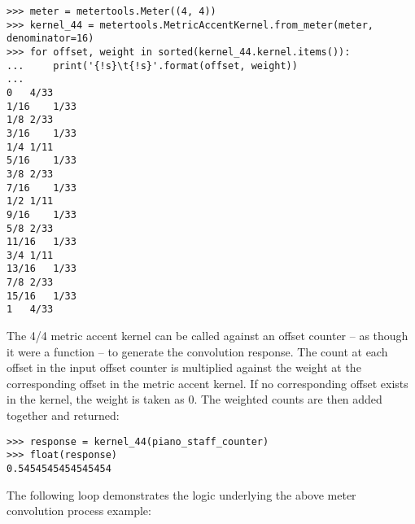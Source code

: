 \begin{comment}
<abjad>
meter = metertools.Meter((4, 4))
kernel_44 = metertools.MetricAccentKernel.from_meter(meter, denominator=16)
for offset, weight in sorted(kernel_44.kernel.items()):
    print('{!s}\t{!s}'.format(offset, weight))

</abjad>
\end{comment}

\begin{abjadbookoutput}
\begin{singlespacing}
\vspace{-0.5\baselineskip}
\begin{verbatim}
>>> meter = metertools.Meter((4, 4))
>>> kernel_44 = metertools.MetricAccentKernel.from_meter(meter, denominator=16)
>>> for offset, weight in sorted(kernel_44.kernel.items()):
...     print('{!s}\t{!s}'.format(offset, weight))
...
0	4/33
1/16	1/33
1/8	2/33
3/16	1/33
1/4	1/11
5/16	1/33
3/8	2/33
7/16	1/33
1/2	1/11
9/16	1/33
5/8	2/33
11/16	1/33
3/4	1/11
13/16	1/33
7/8	2/33
15/16	1/33
1	4/33
\end{verbatim}
\end{singlespacing}
\end{abjadbookoutput}

\noindent The 4/4 metric accent kernel can be called against an offset counter
-- as though it were a function -- to generate the convolution response. The
count at each offset in the input offset counter is multiplied against the
weight at the corresponding offset in the metric accent kernel. If no
corresponding offset exists in the kernel, the weight is taken as 0. The
weighted counts are then added together and returned:

\begin{comment}
<abjad>
response = kernel_44(piano_staff_counter)
float(response)
</abjad>
\end{comment}

\begin{abjadbookoutput}
\begin{singlespacing}
\vspace{-0.5\baselineskip}
\begin{verbatim}
>>> response = kernel_44(piano_staff_counter)
>>> float(response)
0.5454545454545454
\end{verbatim}
\end{singlespacing}
\end{abjadbookoutput}

\noindent The following loop demonstrates the logic underlying the above meter
convolution process example:

